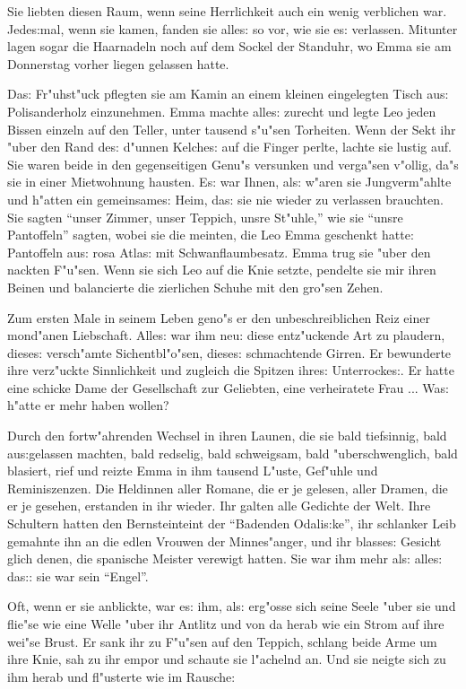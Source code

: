 \documentclass[oneside,12pt]{book}
\newcommand{\s}{s:}%
\begin{document}
Sie liebten diesen Raum, wenn seine Herrlichkeit auch ein wenig
verblichen war. Jede{\s}mal, wenn sie kamen, fanden sie alle{\s}
so vor, wie sie e{\s} verlassen. Mitunter lagen sogar die
Haarnadeln noch auf dem Sockel der Standuhr, wo Emma sie am
Donnerstag vorher liegen gelassen hatte.

Da{\s} Fr"uhst"uck pflegten sie am Kamin an einem kleinen
eingelegten Tisch au{\s} Polisanderholz einzunehmen. Emma machte
alle{\s} zurecht und legte Leo jeden Bissen einzeln auf den
Teller, unter tausend s"u"sen Torheiten. Wenn der Sekt ihr "uber
den Rand de{\s} d"unnen Kelche{\s} auf die Finger perlte, lachte
sie lustig auf. Sie waren beide in den gegenseitigen Genu"s
versunken und verga"sen v"ollig, da"s sie in einer Mietwohnung
hausten. E{\s} war Ihnen, al{\s} w"aren sie Jungverm"ahlte und
h"atten ein gemeinsame{\s} Heim, da{\s} sie nie wieder zu
verlassen brauchten. Sie sagten "`unser Zimmer, unser Teppich,
unsre St"uhle,"' wie sie "`unsre Pantoffeln"' sagten, wobei sie
die meinten, die Leo Emma geschenkt hatte: Pantoffeln au{\s} rosa
Atla{\s} mit Schwanflaumbesatz. Emma trug sie "uber den nackten
F"u"sen. Wenn sie sich Leo auf die Knie setzte, pendelte sie mir
ihren Beinen und balancierte die zierlichen Schuhe mit den gro"sen
Zehen.

Zum ersten Male in seinem Leben geno"s er den unbeschreiblichen
Reiz einer mond"anen Liebschaft. Alle{\s} war ihm neu: diese
ent\/z"uckende Art zu plaudern, diese{\s} versch"amte Sichentbl"o"sen,
diese{\s} schmachtende Girren. Er bewunderte ihre verz"uckte
Sinnlichkeit und zugleich die Spitzen ihre{\s} Unterrocke{\s}. Er
hatte eine schicke Dame der Gesellschaft zur Geliebten, eine
verheiratete Frau ... Wa{\s} h"atte er mehr haben wollen?

Durch den fortw"ahrenden Wechsel in ihren Launen, die sie bald
tiefsinnig, bald au{\s}gelassen machten, bald redselig, bald
schweigsam, bald "uberschwenglich, bald blasiert, rief und reizte
Emma in ihm tausend L"uste, Gef"uhle und Reminis\/zenzen. Die
Heldinnen aller Romane, die er je gelesen, aller Dramen, die er je
gesehen, erstanden in ihr wieder. Ihr galten alle Gedichte der
Welt. Ihre Schultern hatten den Bernsteinteint der "`Badenden
Odali{\s}ke"', ihr schlanker Leib gemahnte ihn an die edlen
Vrouwen der Minnes"anger, und ihr blasse{\s} Gesicht glich denen,
die spanische Meister verewigt hatten. Sie war ihm mehr al{\s}
alle{\s} da{\s}: sie war sein "`Engel"'.

Oft, wenn er sie anblickte, war e{\s} ihm, al{\s} erg"osse sich
seine Seele "uber sie und flie"se wie eine Welle "uber ihr Antlitz
und von da herab wie ein Strom auf ihre wei"se Brust. Er sank ihr
zu F"u"sen auf den Teppich, schlang beide Arme um ihre Knie, sah
zu ihr empor und schaute sie l"achelnd an. Und sie neigte sich zu
ihm herab und fl"usterte wie im Rausche:
\end{document}
